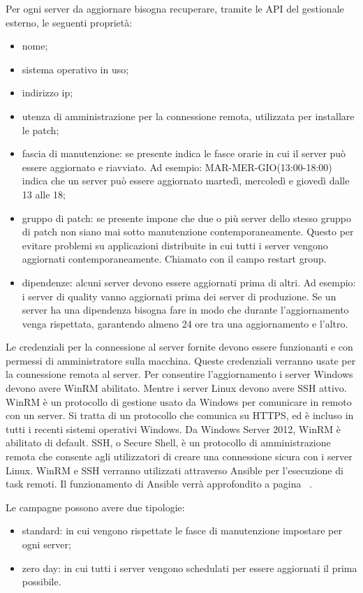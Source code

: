 Per ogni server da aggiornare bisogna recuperare, tramite le API del gestionale 
esterno, le seguenti proprietà:
\begin{itemize}
\item nome;
\item sistema operativo in uso;
\item indirizzo ip;
\item utenza di amministrazione per la connessione remota, utilizzata per 
installare le patch;
\item fascia di manutenzione: se presente indica le fasce orarie in cui il
server può essere aggiornato e riavviato. Ad esempio: MAR-MER-GIO(13:00-18:00)
indica che un server può essere aggiornato martedì, mercoledì e 
giovedì dalle 13 alle 18;
\item gruppo di patch: se presente impone che due o più server dello
stesso gruppo di patch non siano mai sotto manutenzione contemporaneamente. 
Questo per evitare problemi su applicazioni distribuite in cui tutti i server 
vengono aggiornati contemporaneamente. Chiamato con il campo restart group.
\item dipendenze: alcuni server devono essere aggiornati prima di altri. 
Ad esempio: i server di quality vanno aggiornati prima dei server di produzione.
Se un server ha una dipendenza bisogna fare in modo che durante l’aggiornamento
venga rispettata, garantendo almeno 24 ore tra una aggiornamento e l'altro.
\end{itemize}
Le credenziali per la connessione al server fornite devono essere funzionanti e con 
permessi di amministratore sulla macchina. Queste credenziali verranno usate
per la connessione remota al server.
Per consentire l’aggiornamento i server Windows devono avere WinRM abilitato.
Mentre i server Linux devono avere SSH attivo. WinRM è un protocollo di 
gestione usato da Windows per comunicare in remoto con un server. 
Si tratta di un protocollo che comunica su HTTPS, ed è incluso in tutti 
i recenti sistemi operativi Windows. Da Windows Server 2012, WinRM è 
abilitato di default. 
SSH, o Secure Shell, è un protocollo di amministrazione remota che consente 
agli utilizzatori di creare una connessione sicura con i server Linux.
WinRM e SSH verranno utilizzati attraverso Ansible per l’esecuzione di task
remoti. Il funzionamento di Ansible verrà approfondito a 
pagina ~\pageref{subsec:Ansible}.

Le campagne possono avere due tipologie:
\begin{itemize}
\item standard: in cui vengono rispettate le fasce di manutenzione impostare 
per ogni server;
\item zero day: in cui tutti i server vengono schedulati per essere 
aggiornati il prima possibile.
\end{itemize}



